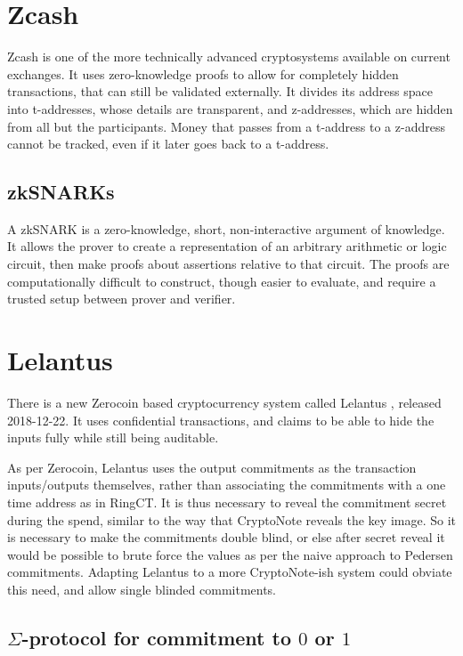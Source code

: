 \documentclass{article}
\begin{document}
\section{Zcash}

Zcash is one of the more technically advanced cryptosystems available on current exchanges.  It uses zero-knowledge proofs to allow for completely hidden transactions, that can still be validated externally.  It divides its address space into t-addresses, whose details are transparent, and z-addresses, which are hidden from all but the participants.  Money that passes from a t-address to a z-address cannot be tracked, even if it later goes back to a t-address.


\subsection{zkSNARKs}

A zkSNARK is a zero-knowledge, short, non-interactive argument of knowledge.  It allows the prover to create a representation of an arbitrary arithmetic or logic circuit, then make proofs about assertions relative to that circuit.  The proofs are computationally difficult to construct, though easier to evaluate, and require a trusted setup between prover and verifier.



\section{Lelantus}

There is a new Zerocoin based cryptocurrency system called Lelantus \cite{lelantus}, released 2018-12-22.  It uses confidential transactions, and claims to be able to hide the inputs fully while still being auditable.  

As per Zerocoin, Lelantus uses the output commitments as the transaction inputs/outputs themselves, rather than associating the commitments with a one time address as in RingCT.  It is thus necessary to reveal the commitment secret during the spend, similar to the way that CryptoNote reveals the key image.  So it is necessary to make the commitments double blind, or else after secret reveal it would be possible to brute force the values as per the naive approach to Pedersen commitments.  Adapting Lelantus to a more CryptoNote-ish system could obviate this need, and allow single blinded commitments.


\subsection{$\Sigma$-protocol for commitment to $0$ or $1$}
\end{document}
